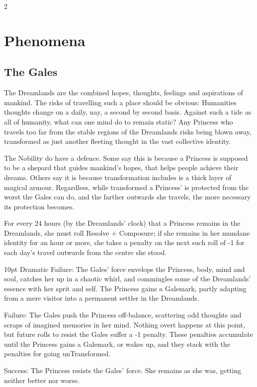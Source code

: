 \begin{multicols}{2}
\section*{Phenomena}

\subsection*{The Gales}

The Dreamlands are the combined hopes, thoughts, feelings and aspirations of mankind. The risks of travelling such a place should be obvious: Humanities thoughts change on a daily, nay, a second by second basis. Against such a tide as all of humanity, what can one mind do to remain static? Any Princess who travels too far from the stable regions of the Dreamlands risks being blown away, transformed as just another fleeting thought in the vast collective identity. 

The Nobility do have a defence. Some say this is because a Princess is supposed to be a shepard that guides mankind's hopes, that helps people achieve their dreams. Others say it is because transformation includes is a thick layer of magical armour. Regardless, while transformed a Princess' is protected from the worst the Gales can do, and the farther outwards she travels, the more necessary its protection becomes. 

For every 24 hours (by the Dreamlands' clock) that a Princess remains in the Dreamlands, she must roll Resolve + Composure; if she remains in her mundane identity for an hour or more, she takes a penalty on the next such roll of -1 for each day's travel outwards from the centre she stood.

   \begin{myindentpar}{10pt} Dramatic Failure: The Gales' force envelops the Princess, body, mind and soul, catches her up in a chaotic whirl, and commingles some of the Dreamlands' essence with her sprit and self. The Princess gains a Galemark, partly adapting from a mere visitor into a permanent settler in the Dreamlands. 
   
    Failure: The Gales push the Princess off-balance, scattering odd thoughts and scraps of imagined memories in her mind. Nothing overt happens at this point, but future rolls to resist the Gales suffer a -1 penalty. These penalties accumulate until the Princess gains a Galemark, or wakes up, and they stack with the penalties for going unTransformed. 
    
    Success: The Princess resists the Gales' force. She remains as she was, getting neither better nor worse. 
    

\end{myindentpar}
\end{multicols}
